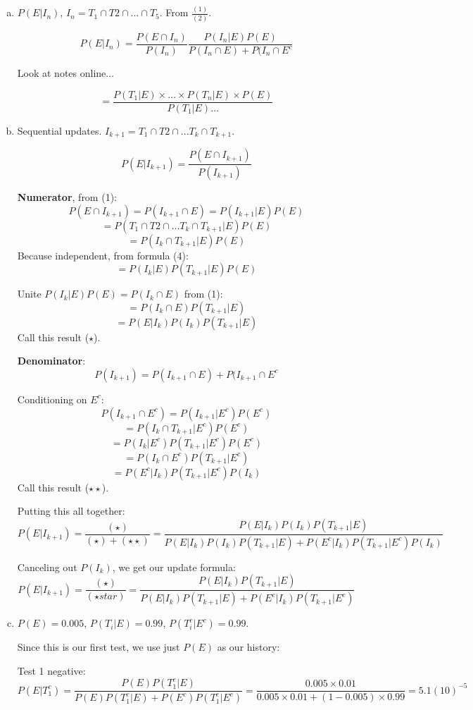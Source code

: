 \documentclass{article}
\begin{document}
\begin{enumerate}[(a)]

\item $P(E|I_n)$, $I_n=T_1 \cap T2 \cap \dots \cap T_5$. From $\frac{(1)}{(2)}$.

$$P(E|I_n) = \frac{P(E \cap I_n)}{P(I_n)}  \frac{P(I_n|E) P(E)}{P(I_n \cap E) + P(I_n \cap E^c}$$ 

Look at notes online...

$$ = \frac{P(T_1|E) \times \dots \times P(T_n|E) \times P(E)}{P(T_1|E) \dots } $$

\item Sequential updates. $I_{k+1} = T_1 \cap T2 \cap ... T_k \cap T_{k+1}$.

$$P(E|I_{k+1}) = \frac{P(E \cap I_{k+1})}{P(I_{k+1})}$$

\textbf{Numerator}, from (1): $$ P(E \cap I_{k+1}) = P(I_{k+1} \cap E) = P(I_{k+1}|E)P(E)$$ $$= P(T_1 \cap T2 \cap ... T_k \cap T_{k+1} | E)P(E) $$
$$= P(I_k \cap T_{k+1} | E)P(E) $$
Because independent, from formula (4): $$= P(I_k | E)P(T_{k+1}|E)P(E) $$

Unite $P(I_k|E)P(E) = P(I_k \cap E)$ from (1): $$ = P(I_k \cap E) P(T_{k+1}|E)$$ $$ = P(E | I_k) P(I_k) P(T_{k+1}|E)$$
Call this result ($\star$).

\textbf{Denominator}: $$P(I_{k+1}) = P(I_{k+1} \cap E) + P(I_{k+1} \cap E^c$$

Conditioning on $E^c$:
$$ P(I_{k+1} \cap E^c) = P(I_{k+1}|E^c) P(E^c)$$
$$ = P(I_k \cap T_{k+1} | E^c) P(E^c) $$
$$ = P(I_k | E^c) P(T_{k+1}|E^c) P(E^c)$$
$$ = P(I_k \cap E^c) P(T_{k+1}|E^c)$$
$$ = P(E^c|I_k) P(T_{k+1}|E^c) P(I_k)$$
Call this result ($ \star \star $).

Putting this all together: $$P(E|I_{k+1}) = \frac{(\star)}{(\star) + (\star \star)} = \frac{P(E | I_k) P(I_k) P(T_{k+1}|E)}{P(E | I_k) P(I_k) P(T_{k+1}|E) + P(E^c|I_k) P(T_{k+1}|E^c) P(I_k)}$$

Canceling out $P(I_k)$, we get our update formula: $$P(E|I_{k+1}) = \frac{(\star)}{(\star star)} = \frac{P(E | I_k) P(T_{k+1}|E)}{P(E | I_k) P(T_{k+1}|E) + P(E^c|I_k) P(T_{k+1}|E^c) }$$

\item 

$P(E) = 0.005$, $P(T_i |E ) = 0.99$, $P(T_i^c | E^c) = 0.99$.

Since this is our first test, we use just $P(E)$ as our history:

Test 1 negative: $$  P(E|T_1^c) = \frac{P(E) P(T_1^c|E)}{P(E) P(T_1^c|E) + P(E^c) P(T_1^c |E^c)} = \frac{0.005 \times 0.01}{0.005 \times 0.01 + (1-0.005) \times 0.99} = 5.1(10)^{-5}$$


\end{enumerate}
\end{document}
